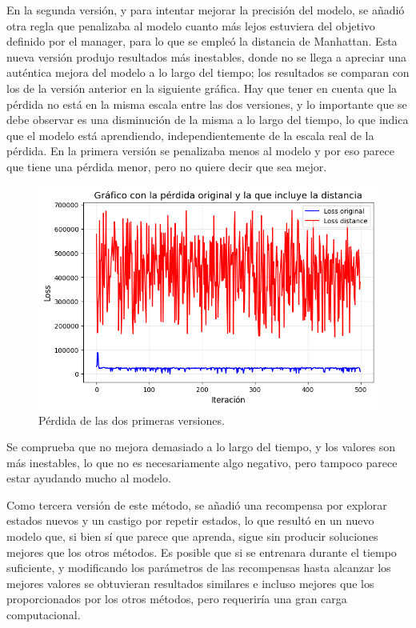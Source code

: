 \documentclass[letterpaper]{article} %
\begin{document}
En la segunda versión, y para intentar mejorar la precisión del modelo, se añadió otra regla que penalizaba al modelo cuanto más lejos estuviera del objetivo definido por el manager, para lo que se empleó la distancia de Manhattan. Esta nueva versión 
produjo resultados más inestables, donde no se llega a apreciar una auténtica mejora del modelo a lo largo del tiempo; los resultados se comparan con los de la versión anterior en la siguiente gráfica. Hay que tener en cuenta que la pérdida no está
en la misma escala entre las dos versiones, y lo importante que se debe observar es una disminución de la misma a lo largo del tiempo, lo que indica que el modelo está aprendiendo, independientemente de la escala real de la pérdida. En la primera versión se 
penalizaba menos al modelo y por eso parece que tiene una pérdida menor, pero no quiere decir que sea mejor.

\begin{figure}[H]
    \centering
    \includegraphics[width=0.9\columnwidth]{FuN_2.png}
    \caption{Pérdida de las dos primeras versiones.\label{fig:FuN4}}
\end{figure}

Se comprueba que no mejora demasiado a lo largo del tiempo, y los valores son más inestables, lo que no es necesariamente algo negativo, pero tampoco parece estar ayudando mucho al modelo.

Como tercera versión de este método, se añadió una recompensa por explorar estados nuevos y un castigo por repetir estados, lo que resultó en un nuevo modelo que, si bien sí que parece que aprenda, sigue sin producir soluciones mejores que los otros métodos. Es posible que si se entrenara durante el 
tiempo suficiente, y modificando los parámetros de las recompensas hasta alcanzar los mejores valores se obtuvieran resultados similares e incluso mejores que los proporcionados por los otros métodos, pero requeriría una gran carga computacional.
\end{document}
